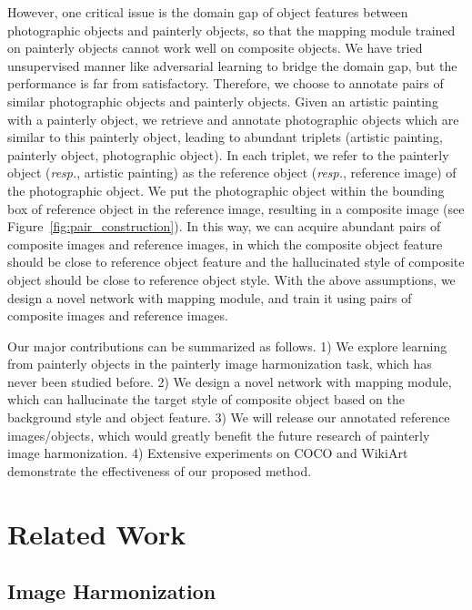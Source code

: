\documentclass[letterpaper]{article} %
\begin{document}
However, one critical issue is the domain gap of object features between photographic objects and painterly objects, so that the mapping module trained on painterly objects cannot work well on composite objects. We have tried unsupervised manner like adversarial learning \cite{goodfellow2020generative} to bridge the domain gap, but the performance is far from satisfactory. Therefore, we choose to annotate pairs of similar photographic objects and painterly objects. Given an artistic painting with a painterly object, we retrieve and annotate photographic objects which are similar to this painterly object, leading to abundant triplets (artistic painting, painterly object, photographic object). In each triplet, we refer to the painterly object (\emph{resp.}, artistic painting) as the reference object (\emph{resp.}, reference image) of the photographic object. We put the photographic object within the bounding box of reference object in the reference image, resulting in a composite image (see Figure~\ref{fig:pair_construction}).
In this way, we can acquire abundant pairs of composite images and reference images, in which the composite object feature should be close to reference object feature and the hallucinated style of composite object should be close to reference object style. With the above assumptions, we design a novel network with mapping module, and train it using pairs of composite images and reference images.

Our major contributions can be summarized as follows. 1) We explore learning from painterly objects in the painterly image harmonization task, which has never been studied before. 2) We design a novel network with mapping module, which can hallucinate the target style of composite object based on the background style and object feature. 3) We will release our annotated reference images/objects, which would greatly benefit the future research of painterly image harmonization.
4) Extensive experiments on COCO \cite{lin2014microsoft} and WikiArt \cite{nichol2016painter} demonstrate the effectiveness of our proposed method.



\section{Related Work}

\subsection{Image Harmonization} \label{sec:image_harmonization}
\end{document}

